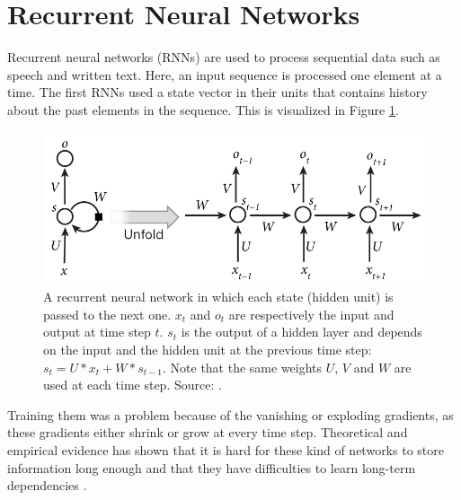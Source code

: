 \section{Recurrent Neural Networks}
Recurrent neural networks (RNNs) are used to process sequential data such as speech and written text. Here, an input sequence is processed one element at a time. The first RNNs used a state vector in their units that contains history about the past elements in the sequence. This is visualized in Figure \ref{fig:rnnunrolled}.
\begin{figure}[htb]
\centering
\includegraphics[width=0.8\linewidth]{images/RNN-unrolled.jpg} %
\caption[Recurrent neural network]{A recurrent neural network in which each state (hidden unit) is passed to the next one. $x_t$ and $o_t$ are respectively the input and output at time step $t$. $s_t$ is the output of a hidden layer and depends on the input and the hidden unit at the previous time step: $s_t = U*x_t + W*s_{t-1}$. Note that the same weights $U$, $V$ and $W$ are used at each time step. Source: \cite{LeCun2015DeepLearning}.}
\label{fig:rnnunrolled}
\end{figure}

Training them was a problem because of the vanishing or exploding gradients, as these gradients either shrink or grow at every time step.
Theoretical and empirical evidence has shown that it is hard for these kind of networks to store information long enough and that they have difficulties to learn long-term dependencies \parencite{bengio1994learning}.\\ %

